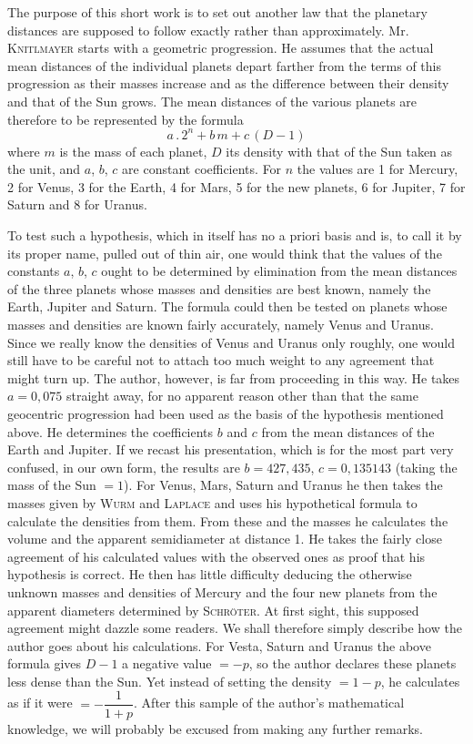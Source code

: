 The purpose of this short work is to set out another law that the planetary distances are supposed to follow exactly rather than approximately. Mr. \textsc{Knitlmayer} starts with a geometric progression. He assumes that the actual mean distances of the individual planets depart farther from the terms of this progression as their masses increase and as the difference between their density and that of the Sun grows. The mean distances of the various planets are therefore to be represented by the formula
\[ a \,.\, 2^n + b\,m + c\,(D - \mathrm{1}) \]
where $m$ is the mass of each planet, $D$ its density with that of the Sun taken as the unit, and $a$, $b$, $c$ are constant coefficients. For $n$ the values are 1 for Mercury, 2 for Venus, 3 for the Earth, 4 for Mars, 5 for the new planets, 6 for Jupiter, 7 for Saturn and 8 for Uranus.

To test such a hypothesis, which in itself has no a priori basis and is, to call it by its proper name, pulled out of thin air, one would think that the values of the constants $a$, $b$, $c$ ought to be determined by elimination from the mean distances of the three planets whose masses and densities are best known, namely the Earth, Jupiter and Saturn. The formula could then be tested on planets whose masses and densities are known fairly accurately, namely Venus and Uranus. Since we really know the densities of Venus and Uranus only roughly, one would still have to be careful not to attach too much weight to any agreement that might turn up. The author, however, is far from proceeding in this way. He takes $a = \mathrm{0{,}075}$ straight away, for no apparent reason other than that the same geocentric progression had been used as the basis of the hypothesis mentioned above. He determines the coefficients $b$ and $c$ from the mean distances of the Earth and Jupiter. If we recast his presentation, which is for the most part very confused, in our own form, the results are $b = \mathrm{427{,}435}$, $c = \mathrm{0{,}135143}$ (taking the mass of the Sun $= \mathrm{1}$). For Venus, Mars, Saturn and Uranus he then takes the masses given by \textsc{Wurm} and \textsc{Laplace} and uses his hypothetical formula to calculate the densities from them. From these and the masses he calculates the volume and the apparent semidiameter at distance 1. He takes the fairly close agreement of his calculated values with the observed ones as proof that his hypothesis is correct. He then has little difficulty deducing the otherwise unknown masses and densities of Mercury and the four new planets from the apparent diameters determined by \textsc{Schröter}. At first sight, this supposed agreement might dazzle some readers. We shall therefore simply describe how the author goes about his calculations. For Vesta, Saturn and Uranus the above formula gives $D - \mathrm{1}$ a negative value $= -p$, so the author declares these planets less dense than the Sun. Yet instead of setting the density $= \mathrm{1} - p$, he calculates as if it were $= -\dfrac{1}{1+p}$. After this sample of the author’s mathematical knowledge, we will probably be excused from making any further remarks.

